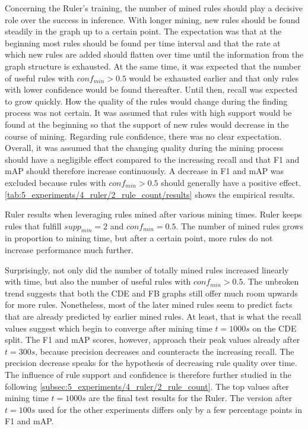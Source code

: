Concerning the Ruler's training, the number of mined rules should play a decisive role over the success in inference. With longer mining, new rules should be found steadily in the graph up to a certain point. The expectation was that at the beginning most rules should be found per time interval and that the rate at which new rules are added should flatten over time until the information from the graph structure is exhausted. At the same time, it was expected that the number of useful rules with $conf_{min} > 0.5$ would be exhausted earlier and that only rules with lower confidence would be found thereafter. Until then, recall was expected to grow quickly. How the quality of the rules would change during the finding process was not certain. It was assumed that rules with high support would be found at the beginning so that the support of new rules would decrease in the course of mining. Regarding rule confidence, there was no clear expectation. Overall, it was assumed that the changing quality during the mining process should have a negligible effect compared to the increasing recall and that F1 and mAP should therefore increase continuously. A decrease in F1 and mAP was excluded because rules with $conf_{min} > 0.5$ should generally have a positive effect. \autoref{tab:5_experiments/4_ruler/2_rule_count/results} shows the empirical results.

\begin{table}
    \makebox[\textwidth][c]{
        
    }
    \caption{Ruler results when leveraging rules mined after various mining times. Ruler keeps rules that fulfill $supp_{min} = 2$ and $conf_{min} = 0.5$. The number of mined rules grows in proportion to mining time, but after a certain point, more rules do not increase performance much further.}
    \label{tab:5_experiments/4_ruler/2_rule_count/results}
\end{table}

Surprisingly, not only did the number of totally mined rules increased linearly with time, but also the number of useful rules with $conf_{min} > 0.5$. The unbroken trend suggests that both the CDE and FB graphs still offer much room upwards for more rules. Nonetheless, most of the later mined rules seem to predict facts that are already predicted by earlier mined rules. At least, that is what the recall values suggest which begin to converge after mining time $t = 1000s$ on the CDE split. The F1 and mAP scores, however, approach their peak values already after $t = 300s$, because precision decreases and counteracts the increasing recall. The precision decrease speaks for the hypothesis of decreasing rule quality over time. The influence of rule support and confidence is therefore further studied in the following \autoref{subsec:5_experiments/4_ruler/2_rule_count}. The top values after mining time $t = 1000s$ are the final test results for the Ruler. The version after $t = 100s$ used for the other experiments differs only by a few percentage points in F1 and mAP\@.
